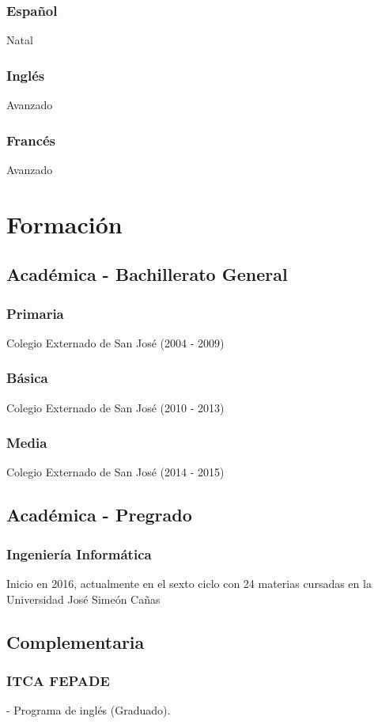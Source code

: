 \documentclass{article}
\begin{document}
    \subsubsection{Español} Natal
    \subsubsection{Inglés} Avanzado
    \subsubsection{Francés} Avanzado
    \section{Formación}
    \subsection{Académica - Bachillerato General}
    \subsubsection{Primaria} Colegio Externado de San José (2004 - 2009)
    \subsubsection{Básica} Colegio Externado de San José (2010 - 2013)
    \subsubsection{Media} Colegio Externado de San José (2014 - 2015)
    \subsection{Académica - Pregrado}
    \subsubsection{Ingeniería Informática}
    Inicio en 2016, actualmente en el sexto ciclo con 24 materias cursadas en la Universidad José Simeón Cañas      
    \subsection{Complementaria}
    \subsubsection{ITCA FEPADE} - Programa de inglés (Graduado).
\end{document}
